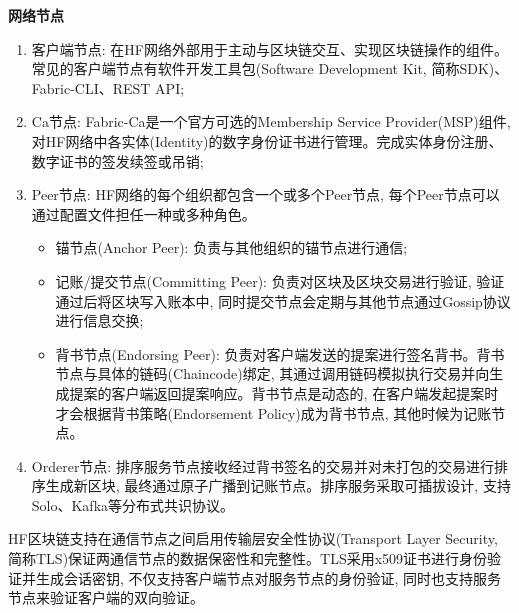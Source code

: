 \textbf{网络节点}
\begin{enumerate}[fullwidth,itemindent=2em,label=(\arabic*)]
    \item 客户端节点: 在HF网络外部用于主动与区块链交互、实现区块链操作的组件。常见的客户端节点有软件开发工具包(Software Development Kit, 简称SDK)\footnotemark[2]、Fabric-CLI\footnotemark[3]、REST API\footnotemark[4];

    \item Ca节点: Fabric-Ca\footnotemark[5]是一个官方可选的Membership Service Provider(MSP)组件, 对HF网络中各实体(Identity)的数字身份证书进行管理。完成实体身份注册、数字证书的签发续签或吊销;

    \item Peer节点: HF网络的每个组织都包含一个或多个Peer节点, 每个Peer节点可以通过配置文件担任一种或多种角色。

    \begin{itemize}[itemindent=2em]
        \item 锚节点(Anchor Peer): 负责与其他组织的锚节点进行通信;

        \item 记账/提交节点(Committing Peer): 负责对区块及区块交易进行验证, 验证通过后将区块写入账本中, 同时提交节点会定期与其他节点通过Gossip协议进行信息交换;

        \item 背书节点(Endorsing Peer): 负责对客户端发送的提案进行签名背书。背书节点与具体的链码(Chaincode)绑定, 其通过调用链码模拟执行交易并向生成提案的客户端返回提案响应。背书节点是动态的, 在客户端发起提案时才会根据背书策略(Endorsement Policy)成为背书节点, 其他时候为记账节点。
    \end{itemize}

    \item Orderer节点: 排序服务节点接收经过背书签名的交易并对未打包的交易进行排序生成新区块, 最终通过原子广播到记账节点。排序服务采取可插拔设计, 支持Solo、Kafka等分布式共识协议。

\end{enumerate}

HF区块链支持在通信节点之间启用传输层安全性协议(Transport Layer Security, 简称TLS)保证两通信节点的数据保密性和完整性。TLS采用x509证书进行身份验证并生成会话密钥, 不仅支持客户端节点对服务节点的身份验证, 同时也支持服务节点来验证客户端的双向验证。


